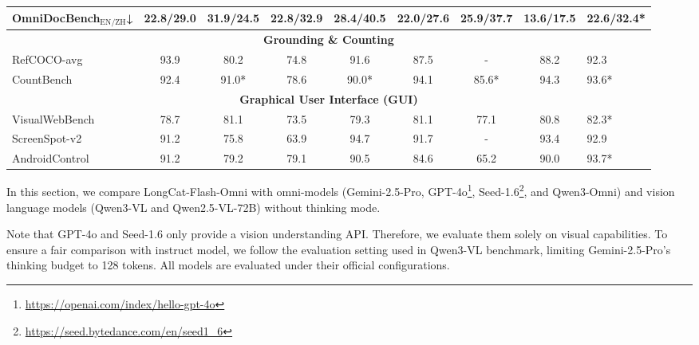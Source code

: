 \documentclass{article}
\begin{document}
\begin{table}[htbp]
{\begin{tabular}{l|cccccc|cl}
            OmniDocBench$_{\text{EN/ZH}}$↓   & 22.8/29.0 & 31.9/24.5 & 22.8/32.9 & 28.4/40.5 & 22.0/27.6  & 25.9/37.7 & 13.6/17.5 & 22.6/32.4* \\
            \midrule
            \multicolumn{9}{c}{\textbf{Grounding \& Counting}} \\
            \midrule
            RefCOCO-avg        & 93.9 & 80.2 & 74.8  & 91.6  & 87.5  & -     & 88.2 & 92.3 \\
            CountBench             & 92.4 & 91.0* & 78.6  & 90.0* & 94.1  & 85.6* & 94.3 & 93.6* \\
            \midrule
            \multicolumn{9}{c}{\textbf{Graphical User Interface (GUI)}} \\
            \midrule
            VisualWebBench       & 78.7 & 81.1  & 73.5  & 79.3  & 81.1 & 77.1 & 80.8  & 82.3* \\
            ScreenSpot-v2        & 91.2 & 75.8  & 63.9  & 94.7  & 91.7 & -    & 93.4  & 92.9 \\
            AndroidControl   & 91.2 & 79.2  & 79.1  & 90.5  & 84.6 & 65.2 & 90.0  & 93.7* \\
            \bottomrule
        \end{tabular}
    }
    \label{tab:eval_image_und}
\end{table}

In this section, we compare LongCat-Flash-Omni with omni-models (Gemini-2.5-Pro\citep{comanici2025gemini}, GPT-4o\footnote{\url{https://openai.com/index/hello-gpt-4o}}, Seed-1.6\footnote{\url{https://seed.bytedance.com/en/seed1_6}}, and Qwen3-Omni\citep{xu2025qwen3}) and vision language models (Qwen3-VL\citep{yang2025qwen3} and Qwen2.5-VL-72B\citep{Qwen2.5-VL}) without thinking mode.

Note that GPT-4o and Seed-1.6 only provide a vision understanding API. Therefore, we evaluate them solely on visual capabilities. To ensure a fair comparison with instruct model, we follow the evaluation setting used in Qwen3-VL benchmark, limiting Gemini-2.5-Pro’s thinking budget to 128 tokens. All models are evaluated under their official configurations.
\end{document}
